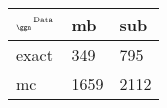 \begin{tabular}{lll}
    \toprule
    $_{\text{\tiny{\ggn}}}$$^{\text{\tiny{Data}}}$ & mb & sub \\
    \midrule
    exact & 349
              & 795 \\
    mc   & 1659
              & 2112 \\
    \bottomrule
\end{tabular}